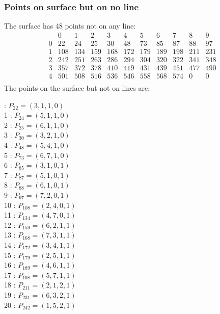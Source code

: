 \documentclass{article}
\begin{document}
{\subsubsection*{Points on surface but on no line}
The surface has 48 points not on any line:\\
$$
\begin{array}{r|*{10}{r}}
 & 0 & 1 & 2 & 3 & 4 & 5 & 6 & 7 & 8 & 9\\
\hline
0 & 22 & 24 & 25 & 30 & 48 & 73 & 85 & 87 & 88 & 97\\
1 & 108 & 134 & 159 & 168 & 172 & 179 & 189 & 198 & 211 & 231\\
2 & 242 & 251 & 263 & 286 & 294 & 304 & 320 & 322 & 341 & 348\\
3 & 357 & 372 & 378 & 410 & 419 & 431 & 439 & 451 & 477 & 490\\
4 & 501 & 508 & 516 & 536 & 546 & 558 & 568 & 574 & 0 & 0\\
\end{array}
$$
The points on the surface but not on lines are:\\
\begin{multicols}{2}
 : $P_{22}=( 3, 1, 1, 0 )$\\
1 : $P_{24}=( 5, 1, 1, 0 )$\\
2 : $P_{25}=( 6, 1, 1, 0 )$\\
3 : $P_{30}=( 3, 2, 1, 0 )$\\
4 : $P_{48}=( 5, 4, 1, 0 )$\\
5 : $P_{73}=( 6, 7, 1, 0 )$\\
6 : $P_{85}=( 3, 1, 0, 1 )$\\
7 : $P_{87}=( 5, 1, 0, 1 )$\\
8 : $P_{88}=( 6, 1, 0, 1 )$\\
9 : $P_{97}=( 7, 2, 0, 1 )$\\
10 : $P_{108}=( 2, 4, 0, 1 )$\\
11 : $P_{134}=( 4, 7, 0, 1 )$\\
12 : $P_{159}=( 6, 2, 1, 1 )$\\
13 : $P_{168}=( 7, 3, 1, 1 )$\\
14 : $P_{172}=( 3, 4, 1, 1 )$\\
15 : $P_{179}=( 2, 5, 1, 1 )$\\
16 : $P_{189}=( 4, 6, 1, 1 )$\\
17 : $P_{198}=( 5, 7, 1, 1 )$\\
18 : $P_{211}=( 2, 1, 2, 1 )$\\
19 : $P_{231}=( 6, 3, 2, 1 )$\\
20 : $P_{242}=( 1, 5, 2, 1 )$\\

\end{multicols}}
\end{document}
